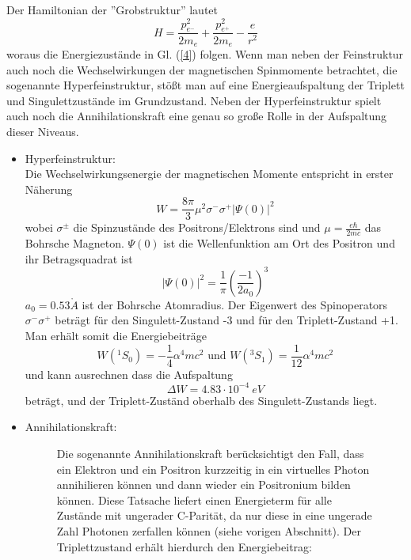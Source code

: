 Der Hamiltonian der ''Grobstruktur'' lautet $$H = \frac{p_{e^-}^2}{2m_e}+\frac{p_{e^+}^2}{2m_e}-\frac{e}{r^2}$$ woraus die Energiezustände in Gl. (\ref{4}) folgen. Wenn man neben der Feinstruktur auch noch die Wechselwirkungen der magnetischen Spinmomente betrachtet, die sogenannte Hyperfeinstruktur, stößt man auf eine Energieaufspaltung der Triplett und Singulettzustände im Grundzustand. Neben der Hyperfeinstruktur spielt auch noch die Annihilationskraft eine genau so große Rolle in der Aufspaltung dieser Niveaus.

\begin{itemize}

\item Hyperfeinstruktur:\\
Die Wechselwirkungsenergie der magnetischen Momente entspricht in erster Näherung
\begin{equation} W = \frac{8\pi}{3}\mu^2\sigma^-\sigma^+|\Psi(0)|^2 \end{equation}
wobei $\sigma^\pm$ die Spinzustände des Positrons/Elektrons sind und $\mu = \frac{e\hbar}{2mc}$ das Bohrsche Magneton. $\Psi(0)$ ist die Wellenfunktion am Ort des Positron und ihr Betragsquadrat ist
$$|\Psi(0)|^2 = \frac{1}{\pi}\left(\frac{-1}{2a_0}\right)^3$$
$a_0 = 0.53 \mathring A$ ist der Bohrsche Atomradius. Der Eigenwert des Spinoperators $\sigma^-\sigma^+$ beträgt für den Singulett-Zustand -3 und für den Triplett-Zustand +1. Man erhält somit die Energiebeiträge
$$W(^1S_0) = -\frac{1}{4}\alpha^4mc^2 \text{\ \ \ \ und \ \ \ \ } W(^3S_1) = \frac{1}{12}\alpha^4mc^2$$
und kann ausrechnen dass die Aufspaltung
\begin{equation} \Delta W = 4.83 \cdot 10^{-4}\ eV \label{theorie_aufspaltung}\end{equation} beträgt, und der Triplett-Zuständ oberhalb des Singulett-Zustands liegt.

\item Annihilationskraft:\\
\begin{figure}[H]
	\begin{minipage}{0.5\textwidth}
	Die sogenannte Annihilationskraft berücksichtigt den Fall, dass ein Elektron und ein Positron kurzzeitig in ein virtuelles Photon annihilieren können und dann wieder ein Positronium bilden können. Diese Tatsache liefert einen Energieterm für alle Zustände mit ungerader C-Parität, da nur diese in eine ungerade Zahl Photonen zerfallen können (siehe vorigen Abschnitt). Der Triplettzustand erhält hierdurch den Energiebeitrag:


\end{minipage}
\end{figure}
\end{itemize}
